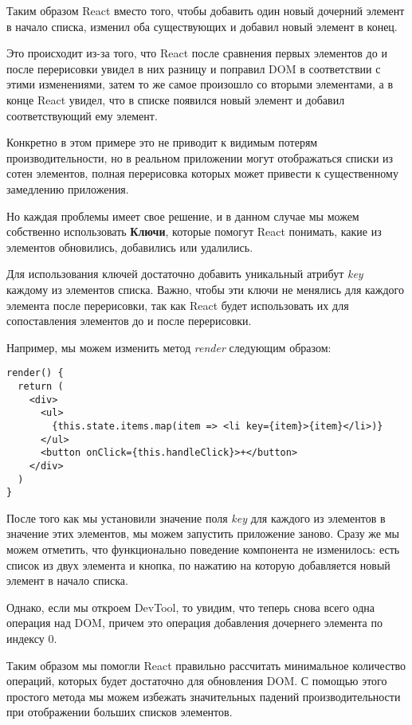 Таким образом React вместо того, чтобы добавить один новый дочерний элемент в начало списка, изменил оба существующих и добавил новый элемент в конец.

Это происходит из-за того, что React после сравнения первых элементов до и после перерисовки увидел в них разницу и поправил DOM в соответствии с этими изменениями, затем то же самое произошло со вторыми элементами, а в конце React увидел, что в списке появился новый элемент и добавил соответствующий ему элемент.

Конкретно в этом примере это не приводит к видимым потерям производительности, но в реальном приложении могут отображаться списки из сотен элементов, полная перерисовка которых может привести к существенному замедлению приложения.

Но каждая проблемы имеет свое решение, и в данном случае мы можем собственно использовать \textbf{Ключи}, которые помогут React понимать, какие из элементов обновились, добавились или удалились.

Для использования ключей достаточно добавить уникальный атрибут \textit{key} каждому из элементов списка. Важно, чтобы эти ключи не менялись для каждого элемента после перерисовки, так как React будет использовать их для сопоставления элементов до и после перерисовки.

Например, мы можем изменить метод \textit{render} следующим образом:

\begin{lstlisting}
render() {
  return (
    <div> 
      <ul>
        {this.state.items.map(item => <li key={item}>{item}</li>)}
      </ul>
      <button onClick={this.handleClick}>+</button>
    </div>
  )
}
\end{lstlisting} 

После того как мы установили значение поля \textit{key} для каждого из элементов в значение этих элементов, мы можем запустить приложение заново. Сразу же мы можем отметить, что функционально поведение компонента не изменилось: есть список из двух элемента и кнопка, по нажатию на которую добавляется новый элемент в начало списка.

Однако, если мы откроем DevTool, то увидим, что теперь снова всего одна операция над DOM, причем это операция добавления дочернего элемента по индексу 0.

Таким образом мы помогли React правильно рассчитать минимальное количество операций, которых будет достаточно для обновления DOM. С помощью этого простого метода мы можем избежать значительных падений производительности при отображении больших списков элементов.

